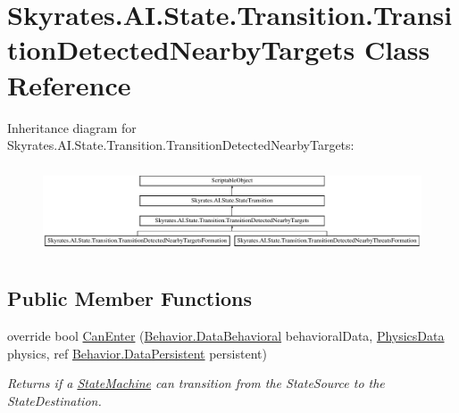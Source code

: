 \hypertarget{class_skyrates_1_1_a_i_1_1_state_1_1_transition_1_1_transition_detected_nearby_targets}{\section{Skyrates.\-A\-I.\-State.\-Transition.\-Transition\-Detected\-Nearby\-Targets Class Reference}
\label{class_skyrates_1_1_a_i_1_1_state_1_1_transition_1_1_transition_detected_nearby_targets}
}
Inheritance diagram for Skyrates.\-A\-I.\-State.\-Transition.\-Transition\-Detected\-Nearby\-Targets\-:\begin{figure}[H]
\begin{center}
\leavevmode
\includegraphics[height=2.635294cm]{class_skyrates_1_1_a_i_1_1_state_1_1_transition_1_1_transition_detected_nearby_targets}
\end{center}
\end{figure}
\subsection*{Public Member Functions}
\begin{DoxyCompactItemize}
\item 
override bool \hyperlink{class_skyrates_1_1_a_i_1_1_state_1_1_transition_1_1_transition_detected_nearby_targets_ac136c79933da8c0d6d245e81f4bf9210}{Can\-Enter} (\hyperlink{class_skyrates_1_1_a_i_1_1_behavior_1_1_data_behavioral}{Behavior.\-Data\-Behavioral} behavioral\-Data, \hyperlink{class_skyrates_1_1_physics_1_1_physics_data}{Physics\-Data} physics, ref \hyperlink{class_skyrates_1_1_a_i_1_1_behavior_1_1_data_persistent}{Behavior.\-Data\-Persistent} persistent)
\begin{DoxyCompactList}\small\item\em Returns if a \hyperlink{class_skyrates_1_1_a_i_1_1_state_1_1_state_machine}{State\-Machine} can transition from the State\-Source to the State\-Destination. \end{DoxyCompactList}\end{DoxyCompactItemize}
